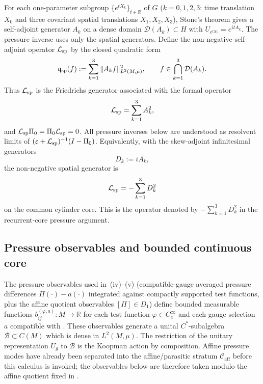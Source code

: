\documentclass[11pt]{amsart}
\numberwithin{equation}{section}
\theoremstyle{plain}
\theoremstyle{definition}
\theoremstyle{remark}
\newcommand{\Caff}{\mathcal C_{\mathrm{aff}}}
\begin{document}
For each one-parameter subgroup \(\{e^{tX_k}\}_{t\in\mathbb R}\) of \(G\)
(\(k=0,1,2,3\): time translation \(X_0\) and three covariant spatial
translations \(X_1,X_2,X_3\)), Stone's theorem gives a self-adjoint
generator \(A_k\) on a dense domain \(\mathcal D(A_k)\subset H\) with
\(U_{e^{tX_k}}=e^{itA_k}\).  The pressure inverse uses only the spatial
generators.  Define the non-negative self-adjoint operator
\(\mathcal L_{\rm sp}\) by the closed quadratic form
\[
   \mathfrak q_{\rm sp}(f)
   :=
   \sum_{k=1}^3\|A_k f\|_{L^2(M,\mu)}^2,
   \qquad
   f\in\bigcap_{k=1}^3\mathcal D(A_k).
\]
Thus \(\mathcal L_{\rm sp}\) is the Friedrichs generator associated with the formal
operator
\[
   \mathcal L_{\rm sp}=\sum_{k=1}^3 A_k^2,
\]
and \(\mathcal L_{\rm sp}\Pi_0=\Pi_0\mathcal L_{\rm sp}=0\).  All pressure
inverses below are understood as resolvent limits of
\((\varepsilon+\mathcal L_{\rm sp})^{-1}(I-\Pi_0)\).
Equivalently, with the skew-adjoint infinitesimal generators
\[
   D_k:=iA_k ,
\]
the non-negative spatial generator is
\[
   \mathcal L_{\rm sp}=-\sum_{k=1}^3D_k^2
\]
on the common cylinder core.  This is the operator denoted by
\(-\sum_{k=1}^3D_k^2\) in the recurrent-core pressure argument.

\subsection{Pressure observables and bounded continuous core}
The pressure observables used in
\,(iv)--(v) (compatible-gauge averaged
pressure differences \(\Pi(\cdot)-a(\cdot)\) integrated against compactly
supported test functions, plus the affine quotient observables
\([\Pi]\in D_1\)) define bounded measurable functions
\(b_{ij}^{(\varphi,a)}\colon M\to\mathbb R\) for each test function
\(\varphi\in C_c^\infty\) and each gauge selection \(a\) compatible with
.  These observables generate a
unital \(C^*\)-subalgebra
\(\mathcal B\subset C(M)\) which is dense in \(L^2(M,\mu)\).  The
restriction of the unitary representation \(U_g\) to \(\mathcal B\) is the
Koopman action by composition.
Affine pressure modes have already been separated into the
affine/parasitic stratum \(\Caff\) before this calculus is invoked; the
observables below are therefore taken modulo the affine quotient fixed in
.
\end{document}
